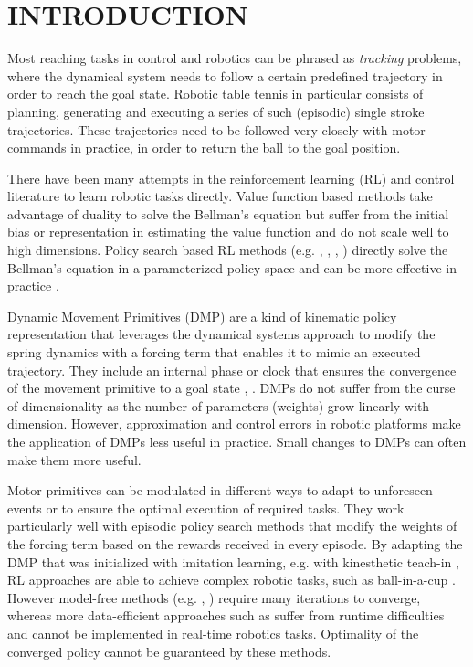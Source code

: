 \section{INTRODUCTION}\label{introduction}


Most reaching tasks in control and robotics can be phrased as \emph{tracking} problems, where the dynamical system needs to follow a certain predefined trajectory in order to reach the goal state. Robotic table tennis in particular \cite{Muelling13} consists of planning, generating and executing a series of such (episodic) single stroke trajectories. These trajectories need to be followed very closely with motor commands in practice, in order to return the ball to the goal position. 

There have been many attempts in the reinforcement learning (RL) \cite{Sutton98} and control literature to learn robotic tasks directly. Value function based methods take advantage of duality to solve the Bellman's equation but suffer from the initial bias or representation in estimating the value function and do not scale well to high dimensions. Policy search based RL methods (e.g. \cite{Kober08}, \cite{Peter10}, \cite{Theodorou10}, \cite{Deisenroth11}) directly solve the Bellman's equation in a parameterized policy space and can be more effective in practice \cite{Kober13}. 

Dynamic Movement Primitives (DMP) are a kind of kinematic policy representation that leverages the dynamical systems approach to modify the spring dynamics with a forcing term that enables it to mimic an executed trajectory. They include an internal phase or clock that ensures the convergence of the movement primitive to a goal state \cite{Ijspeert13}, \cite{Schaal07}. DMPs do not suffer from the curse of dimensionality as the number of parameters (weights) grow linearly with dimension. However, approximation and control errors in robotic platforms make the application of DMPs less useful in practice. Small changes to DMPs can often make them more useful.

Motor primitives can be modulated in different ways to adapt to unforeseen events or to ensure the optimal execution of required tasks. They work particularly well with episodic policy search methods that modify the weights of the forcing term based on the rewards received in every episode. By adapting the DMP that was initialized with imitation learning, e.g. with kinesthetic teach-in \cite{Muelling13}, RL approaches are able to achieve complex robotic tasks, such as ball-in-a-cup \cite{Kober09}. However model-free methods (e.g. \cite{Kober08}, \cite{Peter10}) require many iterations to converge, whereas more data-efficient approaches such as \cite{Deisenroth11} suffer from runtime difficulties and cannot be implemented in real-time robotics tasks. Optimality of the converged policy cannot be guaranteed by these methods.


